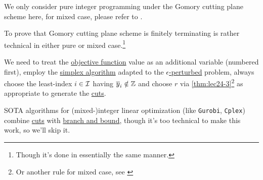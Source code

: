 \begin{remark}
	We only consider pure integer programming under the Gomory cutting plane scheme here, for mixed case, please refer to \cite{Linear-Opt}.
\end{remark}

\begin{remark}
	To prove that Gomory cutting plane scheme is finitely terminating is rather technical in either pure or mixed
	case.\footnote{Though it's done in essentially the same manner.}

	We need to treat the \hyperref[def:objective-function]{objective function} value as an additional variable
	(numbered first), employ the \hyperref[algo:simplex-algorithm]{simplex algorithm} adapted to the
	\hyperref[def:perturbed-problem]{\(\epsilon \)-perturbed} problem, always choose the least-index \(i\in \mathcal{\MakeUppercase{i}} \)
	having \(\overline{y} _i \notin \mathbb{\MakeUppercase{z}} \) and choose \(r\) via \autoref{thm:lec24-3}\footnote{Or another rule for mixed case, see \cite{Linear-Opt}}
	as appropriate to generate the \hyperref[def:Chvatal-Gomory-cut]{cuts}.
\end{remark}

\begin{remark}
	SOTA algorithms for (mixed-)integer linear optimization (like \texttt{Gurobi}, \texttt{Cplex}) combine \hyperref[def:Chvatal-Gomory-cut]{cuts} with
	\hyperref[algo:branch-and-bound-algorithm]{branch and bound}, though it's too technical to make this work, so we'll skip it.
\end{remark}